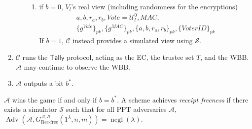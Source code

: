 \documentclass[12pt,a4paper]{article}
\DeclareMathOperator{\negl}{\text{negl}}
\DeclareMathOperator{\Adv}{\text{Adv}}
\theoremstyle{definition}
\newcommand{\Vote}{\mathit{Vote}}
\newcommand{\VoterID}{\mathit{VoterID}}
\newcommand{\Mac}{\mathit{MAC}}
\begin{document}
\begin{definition}
\begin{enumerate}
\begin{itemize}
\begin{enumerate}
                \item if $b=0$, $V_l$'s real view (including randomness for the encryptions)
                \begin{gather*}
                    a, b, r_a, r_b, \Vote=\mathcal{U}^0_l, \Mac,\\\{g^\Vote\}_{pk}, \{g^\Mac\}_{pk}, \{a,b,r_a,r_b\}_{pk},\{\VoterID\}_{pk}
                \end{gather*}
                If $b=1$, $\mathcal{C}$ instead provides a simulated view using $\mathcal{S}$.
            \end{enumerate}
        \end{itemize}
        \item $\mathcal{C}$ runs the $\mathsf{Tally}$ protocol, acting as the EC, the trustee set $T$, and the WBB. $\mathcal{A}$ may continue to observe the WBB.
        \item $\mathcal{A}$ outputs a bit $b^*$.
    \end{enumerate}
    $\mathcal{A}$ wins the game if and only if $b=b^*$. A scheme achieves \textit{receipt freeness} if there exists a simulator $\mathcal{S}$ such that for all PPT adversaries $\mathcal{A}$, $\Adv\left(\mathcal{A}, G^{\mathcal{A},\mathcal{S}}_{\text{Rec-free}}(1^\lambda, n, m)\right)=\negl(\lambda)$.
\end{definition}
\end{document}
